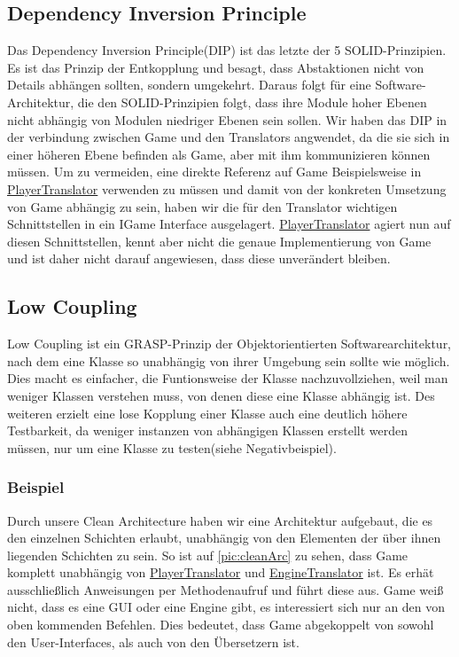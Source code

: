 \documentclass[
10pt, %
a4paper, %
oneside, %
headinclude,footinclude, %
BCOR5mm, %
]{scrartcl}
\begin{document}
\begin{onehalfspace}
\subsection{Dependency Inversion Principle}
\label{sec:depin}
Das Dependency Inversion Principle(DIP) ist das letzte der 5 SOLID-Prinzipien. Es ist das Prinzip der Entkopplung und besagt, dass Abstaktionen nicht von Details abhängen sollten, sondern umgekehrt. Daraus folgt für eine Software-Architektur, die den SOLID-Prinzipien folgt, dass ihre Module hoher Ebenen nicht abhängig von Modulen niedriger Ebenen sein sollen.
Wir haben das DIP in der verbindung zwischen Game und den Translators angwendet, da die sie sich in einer höheren Ebene befinden als Game, aber mit ihm kommunizieren können müssen.
Um zu vermeiden, eine direkte Referenz auf Game Beispielsweise in \href{https://github.com/schmida736/Chess-AdvancedSE/blob/main/Chess-AdvancedSE/Translators/PlayerTranslator.cs}{PlayerTranslator} verwenden zu müssen und damit von der konkreten Umsetzung von Game abhängig zu sein, haben wir die für den Translator wichtigen Schnittstellen in ein IGame Interface ausgelagert. \href{https://github.com/schmida736/Chess-AdvancedSE/blob/main/Chess-AdvancedSE/Translators/PlayerTranslator.cs}{PlayerTranslator} agiert nun auf diesen Schnittstellen, kennt aber nicht die genaue Implementierung von Game und ist daher nicht darauf angewiesen, dass diese unverändert bleiben.
\subsection{Low Coupling}
Low Coupling ist ein GRASP-Prinzip der Objektorientierten Softwarearchitektur, nach dem eine Klasse so unabhängig von ihrer Umgebung sein sollte wie möglich. Dies macht es einfacher, die Funtionsweise der Klasse nachzuvollziehen, weil man weniger Klassen verstehen muss, von denen diese eine Klasse abhängig ist. Des weiteren erzielt eine lose Kopplung einer Klasse auch eine deutlich höhere Testbarkeit, da weniger instanzen von abhängigen Klassen erstellt werden müssen, nur um eine Klasse zu testen(siehe Negativbeispiel).

\subsubsection{Beispiel}
Durch unsere Clean Architecture haben wir eine Architektur aufgebaut, die es den einzelnen Schichten erlaubt, unabhängig von den Elementen der über ihnen liegenden Schichten zu sein. So ist auf \autoref{pic:cleanArc} zu sehen, dass Game komplett unabhängig von \href{https://github.com/schmida736/Chess-AdvancedSE/blob/main/Chess-AdvancedSE/Translators/PlayerTranslator.cs}{PlayerTranslator} und \href{https://github.com/schmida736/Chess-AdvancedSE/blob/main/Chess-AdvancedSE/Translators/EngineTranslator.cs}{EngineTranslator} ist. Es erhät ausschließlich Anweisungen per Methodenaufruf und führt diese aus. Game weiß nicht, dass es eine GUI oder eine Engine gibt, es interessiert sich nur an den von oben kommenden Befehlen. Dies bedeutet, dass Game abgekoppelt von sowohl den User-Interfaces, als auch von den Übersetzern ist.


\end{onehalfspace}
\end{document}
